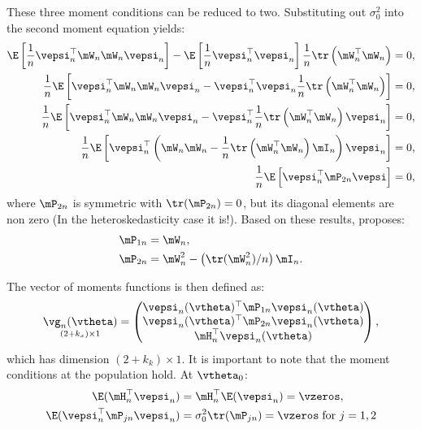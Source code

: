 \documentclass[english,12pt]{book}\usepackage[]{graphicx}\usepackage[]{xcolor}
\begin{document}
These three moment conditions can be reduced to two. Substituting out $\sigma^2_0$ into the second moment equation yields:
\begin{equation*}
  \begin{aligned}
    \E\left[\frac{1}{n}\vepsi^\top_n\mW_n\mW_n\vepsi_n\right] - \E\left[\frac{1}{n}\vepsi^\top_n \vepsi_n\right] \frac{1}{n}\tr\left(\mW^\top_n\mW_n\right) & = 0, \\
    \frac{1}{n}\E\left[\vepsi^\top_n\mW_n\mW_n\vepsi_n - \vepsi^\top_n \vepsi_n\frac{1}{n}\tr\left(\mW^\top_n\mW_n\right)\right] & = 0, \\
     \frac{1}{n}\E\left[\vepsi^\top_n\mW_n\mW_n\vepsi_n - \vepsi^\top_n \frac{1}{n}\tr\left(\mW^\top_n\mW_n\right)\vepsi_n\right] & = 0,\\
     \frac{1}{n}\E\left[\vepsi^\top_n\left(\mW_n\mW_n - \frac{1}{n}\tr\left(\mW^\top_n\mW_n\right)\mI_n\right)\vepsi_n\right] & = 0, \\
     \frac{1}{n}\E\left[\vepsi^\top_n\mP_{2n}\vepsi\right] & = 0, 
  \end{aligned}
\end{equation*}
%
where $\mP_{2n}$ is symmetric with $\tr(\mP_{2n}) = 0$, but its diagonal elements are non zero (In the heteroskedasticity case it is!). Based on these results, \cite{lee2007gmm} proposes:
\begin{align*}
\mP_{1n} & = \mW_n, \\
\mP_{2n} & = \mW^2_n - \left(\tr(\mW^2_n)/n\right)\mI_n.
\end{align*}

The vector of moments functions is then defined as:
\begin{equation}\label{eq:moments-lee-2007}
\underset{(2 + k_x)\times 1}{\vg_n(\vtheta)} = \begin{pmatrix}
\vepsi_n(\vtheta)^\top\mP_{1n}\vepsi_n(\vtheta) \\
\vepsi_n(\vtheta)^\top\mP_{2n}\vepsi_n(\vtheta) \\
\mH_n^\top\vepsi_n(\vtheta)
\end{pmatrix},
\end{equation}
%
which has dimension $(2 + k_k) \times 1$. It is important to note that the moment conditions at the population hold. At $\vtheta_0$:
\begin{equation*}
\begin{aligned}
\E(\mH_n^\top\vepsi_n) & = \mH_n^\top\E(\vepsi_n) = \vzeros,  \\
\E(\vepsi_n^\top \mP_{jn}\vepsi_n) & = \sigma_0^2\tr(\mP_{jn}) = \vzeros\;\mbox{for $j = 1,2$}
\end{aligned}
\end{equation*}
\end{document}
